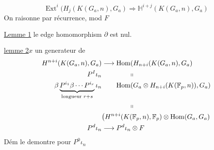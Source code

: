 \[
\operatorname{Ext}^i(H_j(K(G_a,n),G_a)\Longrightarrow\mathbb H^{i+j}(K(G_a,n),G_a)
\]
On raisonne par récurrence, mod $F$

\uline{Lemme 1} le edge homomorphism $\partial$ est nul.

\uline{lemme 2}\qquad $x$ un generateur de
\[
\begin{aligned}
H^{n+i}(K(G_a,n),G_a)&\longrightarrow\operatorname{Hom}(H_{n+i}(K(G_a,n),G_a)\\
P^I\iota_n&\hspace{4em}\shortparallel\\
\beta\underbrace{P^{i_1}\beta\cdots P^{i_r}}_{\text{longueur }r+s}\iota_n
 &\qquad\operatorname{Hom}(G_a\otimes H_{n+i}(K(\mathbb F_p,n)),G_a)\\
&\hspace{4em}\shortparallel\\
&\big(H^{n+i}(K(\mathbb F_p,n),\mathbb F_p)\otimes\operatorname{Hom}(G_a,G_a)\\
P^d\iota_n&\longrightarrow P^d\iota_n\otimes F
\end{aligned}
\]
Dém\qquad {} le demontre pour $P^0\iota_n$


